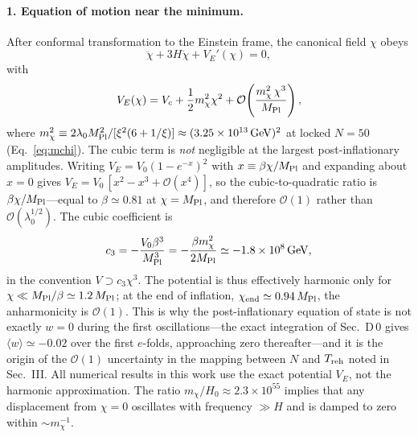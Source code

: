 \documentclass[pdflatex,sn-mathphys-num]{sn-jnl}
\newcommand{\MP}{M_{\rm Pl}}
\theoremstyle{thmstyleone}
\begin{document}
\begin{appendices}
\paragraph{1. Equation of motion near the minimum.} After conformal transformation to the Einstein frame, the canonical field $\chi$ obeys
\begin{equation}
\ddot\chi+3H\dot\chi+V_E'(\chi)=0,
\label{eq:D1}
\end{equation}
with
\begin{equation}
V_E(\chi)=V_c+\frac12 m_\chi^2\chi^2+\mathcal{O}\!\left(\frac{m_\chi^2\,\chi^3}{\MP}\right),
\label{eq:D2}
\end{equation}
where $m_\chi^2\equiv2\lambda_0\MP^2/[\xi^2(6+1/\xi)]\approx(3.25\times10^{13}\,{\rm GeV})^2$ at locked $N=50$ (Eq.~\eqref{eq:mchi}). The cubic term is \emph{not} negligible at the largest post-inflationary amplitudes. Writing $V_E=V_0(1-e^{-x})^2$ with $x\equiv\beta\chi/\MP$ and expanding about $x=0$ gives $V_E=V_0\,[x^2-x^3+\mathcal{O}(x^4)]$, so the cubic-to-quadratic ratio is $\beta\chi/\MP$---equal to $\beta\simeq0.81$ at $\chi=\MP$, and therefore $\mathcal{O}(1)$ rather than $\mathcal{O}(\lambda_0^{1/2})$. The cubic coefficient is
\begin{equation}
c_3=-\frac{V_0\beta^3}{\MP^3}=-\frac{\beta m_\chi^2}{2\MP}\simeq-1.8\times10^{8}\,{\rm GeV},
\end{equation}
in the convention $V\supset c_3\chi^3$. The potential is thus effectively harmonic only for $\chi\ll\MP/\beta\simeq1.2\,\MP$; at the end of inflation, $\chi_{\rm end}\simeq0.94\,\MP$, the anharmonicity is $\mathcal{O}(1)$. This is why the post-inflationary equation of state is not exactly $w=0$ during the first oscillations---the exact integration of Sec.~D\,0 gives $\langle w\rangle\simeq-0.02$ over the first $e$-folds, approaching zero thereafter---and it is the origin of the $\mathcal{O}(1)$ uncertainty in the mapping between $N$ and $T_{\rm reh}$ noted in Sec.~III. All numerical results in this work use the exact potential $V_E$, not the harmonic approximation. The ratio $m_\chi/H_0\approx2.3\times10^{55}$ implies that any displacement from $\chi=0$ oscillates with frequency $\gg H$ and is damped to zero within $\sim m_\chi^{-1}$.


\end{appendices}
\end{document}
